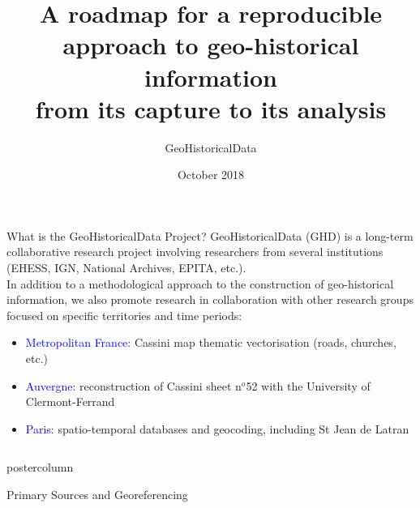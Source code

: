 \documentclass[final,hyperref={pdfpagelabels=false}]{beamer}
\title{A roadmap for a reproducible approach to geo-historical information\\from its capture to its analysis}
\author{GeoHistoricalData}
\institute{~}
\date{October 2018}
\let\oldcite=\cite
\renewcommand{\cite}[1]{\textcolor{ta3chameleon}{\oldcite{#1}}}
\begin{document}
\begin{frame}
  \begin{block}{What is the GeoHistoricalData Project?}
    \textcolor{ta3orange}{GeoHistoricalData} (GHD) is a long-term collaborative research project involving researchers from several institutions (EHESS, IGN, National Archives, EPITA, etc.).\\
    In addition to a methodological approach to the construction of geo-historical information, we also promote research in collaboration with other research groups focused on specific territories and time periods:
    \begin{itemize}
    \item \textcolor{blue}{Metropolitan France:} \textcolor{ta3orange}{Cassini} map thematic vectorisation (roads, churches, etc.)
    \item \textcolor{blue}{Auvergne:} \textcolor{ta3orange}{reconstruction of Cassini sheet n$^{o}$52} with the University of Clermont-Ferrand
    \item \textcolor{blue}{Paris:} spatio-temporal databases and geocoding, including \textcolor{ta3orange}{St Jean de Latran}~\cite{Rebolledo-Dhuin2014}
    \end{itemize}
  \end{block}
  \begin{columns}
    \begin{column}{0.5\textwidth}
    \begin{beamercolorbox}[center,wd=\textwidth]{postercolumn}
    \begin{minipage}[t]{.98\textwidth}
    \renewcommand{\footnoterule}{}
    \begin{block}{Primary Sources and Georeferencing}
      \centering
      \begin{tabular}{p{}p{}}

\end{tabular}
\end{block}
\end{minipage}
\end{beamercolorbox}
\end{column}
\end{columns}
\end{frame}
\end{document}
